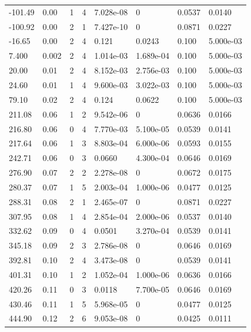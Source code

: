 \documentclass[preview]{standalone}
\begin{document}
{{\begin{tabular}{L{1.2cm}C{1.2cm} C{0.3cm}C{0.5cm} C{1.4cm}C{1.4cm} C{1.4cm}C{1.4cm}}
  -101.49  &  0.00  & 1     &  4 &  7.028e-08  & 0  & 0.0537 &  0.0140   \\ 
  -100.92  &  0.00  & 2     &  1 &  7.427e-10  & 0  & 0.0871 &  0.0227   \\ 
  -16.65  &  0.00  & 2     &  4 &  0.121  & 0.0243  & 0.100 &  5.000e-03   \\ 
  7.400  &  0.002  & 2     &  4 &  1.014e-03  & 1.689e-04  & 0.100 &  5.000e-03   \\ 
  20.00  &  0.01  & 2     &  4 &  8.152e-03  & 2.756e-03  & 0.100 &  5.000e-03   \\ 
  24.60  &  0.01  & 1     &  4 &  9.600e-03  & 3.022e-03  & 0.100 &  5.000e-03   \\ 
  79.10  &  0.02  & 2     &  4 &  0.124  & 0.0622  & 0.100 &  5.000e-03   \\ 
  211.08  &  0.06  & 1     &  2 &  9.542e-06  & 0  & 0.0636 &  0.0166   \\ 
  216.80  &  0.06  & 0     &  4 &  7.770e-03  & 5.100e-05  & 0.0539 &  0.0141   \\ 
  217.64  &  0.06  & 1     &  3 &  8.803e-04  & 6.000e-06  & 0.0593 &  0.0155   \\ 
  242.71  &  0.06  & 0     &  3 &  0.0660  & 4.300e-04  & 0.0646 &  0.0169   \\ 
  276.90  &  0.07  & 2     &  2 &  2.278e-08  & 0  & 0.0672 &  0.0175   \\ 
  280.37  &  0.07  & 1     &  5 &  2.003e-04  & 1.000e-06  & 0.0477 &  0.0125   \\ 
  288.31  &  0.08  & 2     &  1 &  2.465e-07  & 0  & 0.0871 &  0.0227   \\ 
  307.95  &  0.08  & 1     &  4 &  2.854e-04  & 2.000e-06  & 0.0537 &  0.0140   \\ 
  332.62  &  0.09  & 0     &  4 &  0.0501  & 3.270e-04  & 0.0539 &  0.0141   \\ 
  345.18  &  0.09  & 2     &  3 &  2.786e-08  & 0  & 0.0646 &  0.0169   \\ 
  392.81  &  0.10  & 2     &  4 &  3.473e-08  & 0  & 0.0539 &  0.0141   \\ 
  401.31  &  0.10  & 1     &  2 &  1.052e-04  & 1.000e-06  & 0.0636 &  0.0166   \\ 
  420.26  &  0.11  & 0     &  3 &  0.0118  & 7.700e-05  & 0.0646 &  0.0169   \\ 
  430.46  &  0.11  & 1     &  5 &  5.968e-05  & 0  & 0.0477 &  0.0125   \\ 
  444.90  &  0.12  & 2     &  6 &  9.053e-08  & 0  & 0.0425 &  0.0111   \\ 

\end{tabular}}}
\end{document}
